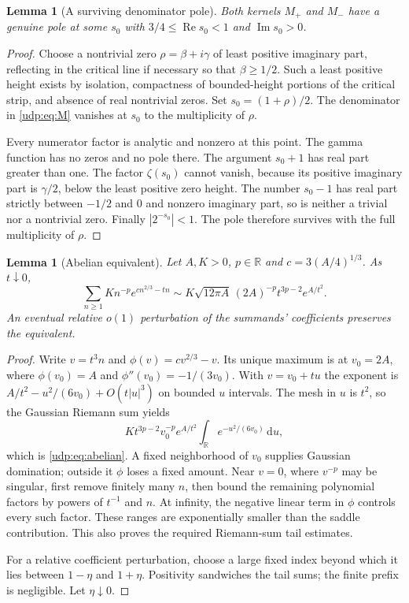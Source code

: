 \documentclass[11pt]{article}
\newtheorem{lemma}[theorem]{Lemma}
\theoremstyle{remark}\newtheorem{remark}[theorem]{Remark}
\DeclareMathOperator{\Rea}{Re}
\DeclareMathOperator{\Ima}{Im}
\newcommand{\dd}{\,\mathrm d}
\newcommand{\R}{\mathbb R}
\numberwithin{equation}{section}
\begin{document}
\begin{lemma}[A surviving denominator pole]\label{udp:lem:pole}
Both kernels $M_+$ and $M_-$ have a genuine pole at some $s_0$ with $3/4\le\Rea s_0<1$ and $\Ima s_0>0$.
\end{lemma}
\begin{proof}
Choose a nontrivial zero $\rho=\beta+i\gamma$ of least positive imaginary part, reflecting in the critical line if necessary so that $\beta\ge1/2$. Such a least positive height exists by isolation, compactness of bounded-height portions of the critical strip, and absence of real nontrivial zeros. Set $s_0=(1+\rho)/2$. The denominator in \eqref{udp:eq:M} vanishes at $s_0$ to the multiplicity of $\rho$.

Every numerator factor is analytic and nonzero at this point. The gamma function has no zeros and no pole there. The argument $s_0+1$ has real part greater than one. The factor $\zeta(s_0)$ cannot vanish, because its positive imaginary part is $\gamma/2$, below the least positive zero height. The number $s_0-1$ has real part strictly between $-1/2$ and $0$ and nonzero imaginary part, so is neither a trivial nor a nontrivial zero. Finally $|2^{-s_0}|<1$. The pole therefore survives with the full multiplicity of $\rho$.
\end{proof}

\begin{lemma}[Abelian equivalent]\label{udp:lem:abelian}
Let $A,K>0$, $p\in\R$ and $c=3(A/4)^{1/3}$. As $t\downarrow0$,
\begin{equation}\label{udp:eq:abelian}
 \sum_{n\ge1}K n^{-p}e^{cn^{2/3}-tn}
 \sim K\sqrt{12\pi A}\,(2A)^{-p}t^{3p-2}e^{A/t^2}.
\end{equation}
An eventual relative $o(1)$ perturbation of the summands' coefficients preserves the equivalent.
\end{lemma}
\begin{proof}
Write $v=t^3n$ and $\phi(v)=cv^{2/3}-v$. Its unique maximum is at $v_0=2A$, where $\phi(v_0)=A$ and $\phi''(v_0)=-1/(3v_0)$. With $v=v_0+tu$ the exponent is $A/t^2-u^2/(6v_0)+O(t|u|^3)$ on bounded $u$ intervals. The mesh in $u$ is $t^2$, so the Gaussian Riemann sum yields
\[
 Kt^{3p-2}v_0^{-p}e^{A/t^2}
 \int_{\R}e^{-u^2/(6v_0)}\dd u,
\]
which is \eqref{udp:eq:abelian}. A fixed neighborhood of $v_0$ supplies Gaussian domination; outside it $\phi$ loses a fixed amount. Near $v=0$, where $v^{-p}$ may be singular, first remove finitely many $n$, then bound the remaining polynomial factors by powers of $t^{-1}$ and $n$. At infinity, the negative linear term in $\phi$ controls every such factor. These ranges are exponentially smaller than the saddle contribution. This also proves the required Riemann-sum tail estimates.

For a relative coefficient perturbation, choose a large fixed index beyond which it lies between $1-\eta$ and $1+\eta$. Positivity sandwiches the tail sums; the finite prefix is negligible. Let $\eta\downarrow0$.
\end{proof}
\end{document}
